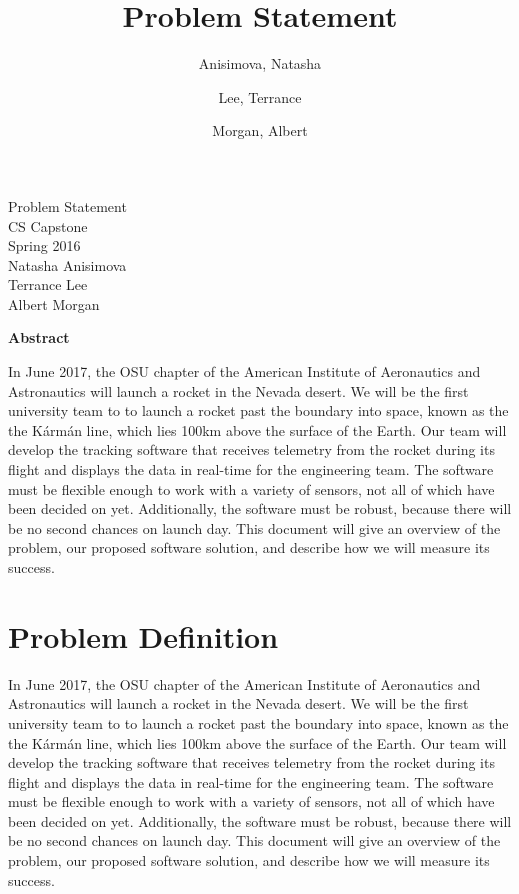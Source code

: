\documentclass[10pt,journal,draftclsnofoot,onecolumn]{IEEEtran}
\begin{document}
\singlespace

\title{\vspace{2in}Problem Statement}

\author {
	Anisimova, Natasha
	\and
	Lee, Terrance
	\and
	Morgan, Albert
}


\pagestyle{empty}
\vspace*{2in}
\begin{center}
\huge
Problem Statement\\
\normalsize
\vspace{5mm}
CS Capstone\\
Spring 2016\\
\vspace{5mm}
Natasha Anisimova\\
Terrance Lee\\
Albert Morgan
\end{center}

\vspace{5mm}

\begin{center}
\textbf{Abstract}
\end{center}

\begin{adjustwidth}{2in}{2in}
In June 2017, the \ac{OSU} chapter of the
American Institute of Aeronautics and Astronautics will launch a rocket in the Nevada desert.
We will be the first university team to to launch a rocket past the boundary into space,
known as the the K\'{a}rm\'{a}n line, which lies 100km above the surface of the Earth.
Our team will develop the tracking software that receives
telemetry from the rocket during its flight
and displays the data in real-time for the engineering team.
The software must be flexible enough to work with a variety of sensors,
not all of which have been decided on yet.
Additionally, the software must be robust,
because there will be no second chances on launch day.
This document will give an overview of the problem,
our proposed software solution,
and describe how we will measure its success.
\end{adjustwidth}

\newpage
\pagestyle{headings}
\section{Problem Definition}
In June 2017, the \ac{OSU} chapter of the
American Institute of Aeronautics and Astronautics will launch a rocket in the Nevada desert.
We will be the first university team to to launch a rocket past the boundary into space,
known as the the K\'{a}rm\'{a}n line, which lies 100km above the surface of the Earth.
Our team will develop the tracking software that receives
telemetry from the rocket during its flight
and displays the data in real-time for the engineering team.
The software must be flexible enough to work with a variety of sensors,
not all of which have been decided on yet.
Additionally, the software must be robust,
because there will be no second chances on launch day.
This document will give an overview of the problem,
our proposed software solution,
and describe how we will measure its success.
\end{document}
